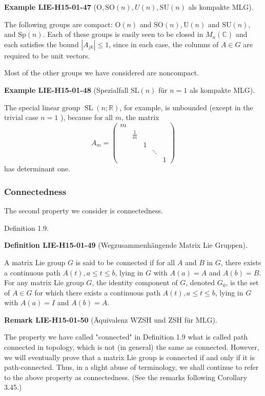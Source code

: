 \documentclass[10pt, letterpaper]{article}
\newcommand{\SL}{\mathrm{SL}}
\newcommand{\SO}{\mathrm{SO}}
\newcommand{\SU}{\mathrm{SU}}
\newcommand{\Ogroup}{\mathrm{O}} %
\newcommand{\CustomHeading}[3]{%
  \par\medskip\noindent%
  \textbf{#1 #2} \textnormal{(#3)}.\enskip%
}
\newenvironment{DEF}[2]{\begin{unitbox}\CustomHeading{Definition}{#1}{#2}}{\end{unitbox}}
\newenvironment{REM}[2]{\begin{unitbox}\CustomHeading{Remark}{#1}{#2}}{\end{unitbox}}
\newenvironment{EXA}[2]{\begin{unitbox}\CustomHeading{Example}{#1}{#2}}{\end{unitbox}}
\begin{document}
\begin{EXA}{LIE-H15-01-47}{$\Ogroup, \SO(n),U(n),\SU(n)$ als kompakte MLG}
The following groups are compact: $\mathrm{O}(n)$ and $\mathrm{SO}(n), \mathrm{U}(n)$ and $\mathrm{SU}(n)$, and $\mathrm{Sp}(n)$. Each of these groups is easily seen to be closed in $M_{n}(\mathbb{C})$ and each satisfies the bound $\left|A_{j k}\right| \leq 1$, since in each case, the columns of $A \in G$ are required to be unit vectors.
\end{EXA}


Most of the other groups we have considered are noncompact. 

\begin{EXA}{LIE-H15-01-48}{Spezialfall $\SL(n)$ für $n=1$ als kompakte MLG}
The special linear group $\operatorname{SL}(n ; \mathbb{R})$, for example, is unbounded (except in the trivial case $n=1$ ), because for all $m$, the matrix
$$
A_{m}=\left(\begin{array}{ccccc}
m & & & & \\
& \frac{1}{m} & & & \\
& & 1 & & \\
& & & \ddots & \\
& & & & 1
\end{array}\right)
$$
has determinant one.
\end{EXA}

\subsubsection*{Connectedness}


The second property we consider is connectedness.


Definition 1.9. 


\begin{DEF}{LIE-H15-01-49}{Wegzusammenhängende Matrix Lie Gruppen}
A matrix Lie group $G$ is said to be connected if for all $A$ and $B$ in $G$, there exists a continuous path $A(t), a \leq t \leq b$, lying in $G$ with $A(a)=A$ and $A(b)=B$. For any matrix Lie group $G$, the identity component of $G$, denoted $G_{0}$, is the set of $A \in G$ for which there exists a continuous path $A(t), a \leq t \leq b$, lying in $G$ with $A(a)=I$ and $A(b)=A$.
\end{DEF}

\begin{REM}{LIE-H15-01-50}{Äquivalenz WZSH und ZSH für MLG}
The property we have called "connected" in Definition 1.9 what is called path connected in topology, which is not (in general) the same as connected. However, we will eventually prove that a matrix Lie group is connected if and only if it is path-connected. Thus, in a slight abuse of terminology, we shall continue to refer to the above property as connectedness. (See the remarks following Corollary 3.45.)
\end{REM}
\end{document}
